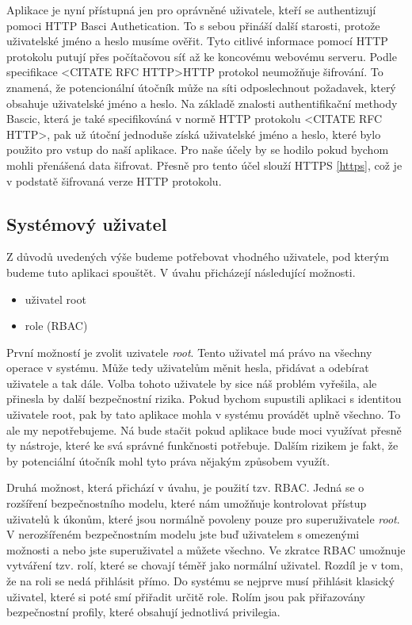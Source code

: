Aplikace je nyní přístupná jen pro oprávněné uživatele, kteří se authentizují pomoci HTTP Basci Authetication. To s sebou přináší další starosti, protože uživatelské jméno a heslo musíme ověřit. Tyto citlivé informace pomocí HTTP protokolu putují přes počítačovou síť až ke koncovému webovému serveru. Podle specifikace <CITATE RFC HTTP>HTTP protokol neumožňuje šifrování. To znamená, že potencionální útočník může na síti odposlechnout požadavek, který obsahuje uživatelské jméno a heslo. Na základě znalosti authentifikační methody Bascic, která je také specifikováná v normě HTTP protokolu <CITATE RFC HTTP>, pak už útoční jednoduše získá uživatelské jméno a heslo, které bylo použito pro vstup do naší aplikace. Pro naše účely by se hodilo pokud bychom mohli přenášená data šifrovat. Přesně pro tento účel slouží HTTPS \ref{https}, což je v podstatě šifrovaná verze HTTP protokolu.
    \subsection{Systémový uživatel}
    \label{sysuser}
    Z důvodů uvedených výše budeme potřebovat vhodného uživatele, pod kterým budeme tuto aplikaci spouštět. V úvahu přicházejí následující možnosti.
    \begin{itemize}
      \item uživatel root
      \item role (RBAC)
    \end{itemize}
    
    První možností je zvolit uzivatele \emph{root}. Tento uživatel má právo na všechny operace v systému. Může tedy uživatelům měnit hesla, přidávat a odebírat uživatele a tak dále. Volba tohoto uživatele by sice náš problém vyřešila, ale přinesla by další bezpečnostní rizika. Pokud bychom supustili aplikaci s identitou uživatele root, pak by tato aplikace mohla v systému provádět uplně všechno. To ale my nepotřebujeme. Ná bude stačit pokud aplikace bude moci využívat přesně ty nástroje, které ke svá správné funkčnosti potřebuje. Dalším rizikem je fakt, že by potenciální útočník mohl tyto práva nějakým způsobem využít.
    
    Druhá možnost, která přichází v úvahu, je použití tzv. RBAC. Jedná se o rozšíření bezpečnostního modelu, které nám umožňuje kontrolovat přístup uživatelů k úkonům, které jsou normálně povoleny pouze pro superuživatele \emph{root}. V nerozšířeném bezpečnostním modelu jste buď uživatelem s omezenými možnosti a nebo jste superuživatel a můžete všechno.
    Ve zkratce RBAC umožnuje vytváření tzv. rolí, které se chovají téměř jako normální uživatel. Rozdíl je v tom, že na roli se nedá přihlásit přímo. Do systému se nejprve musí přihlásit klasický uživatel, které si poté smí přiřadit určitě role. Rolím jsou pak přiřazovány bezpečnostní profily, které obsahují jednotlivá privilegia.
    
